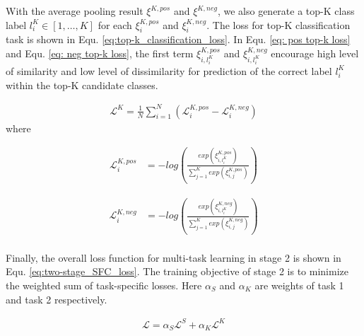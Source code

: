 \documentclass[letterpaper]{article} %
\begin{document}
  With  the  average pooling result ${\xi}^{K,pos}$ and ${\xi}^{K,neg}$, we also
  generate   a   top-K   class   label   $l^{K}_i\in   [1,\dots,K]$   for   each
  ${\xi}^{K,pos}_{i}$ and ${\xi}^{K,neg}_{i}$. The loss for top-K classification
  task is shown in Equ. \ref{eq:top-k_classification_loss}. In Equ. \ref{eq: pos
  top-k   loss}   and   Equ.   \ref{eq:   neg   top-k   loss},  the  first  term
  $\xi_{i,l^{K}_{i}}^{K,pos}$  and  $\xi_{i,l^{K}_{i}}^{K,neg}$  encourage  high
  level  of  similarity  and  low  level  of dissimilarity for prediction of the
  correct label $l^{K}_i$ within the top-K candidate classes.

  \begin{align}
    \mathcal{L}^{K} = \frac{1}{N}\sum_{i=1}^{N}(\mathcal{L}^{K,pos}_{i} - \mathcal{L}^{K,neg}_{i})
    \label{eq:top-k_classification_loss}
  \end{align}
  where

  \begin{equation}
    \begin{aligned}
      \mathcal{L}^{K,pos}_{i} &= -log(\frac{exp(\xi_{i,l^{K}_{i}}^{K,pos})}{\sum_{j=1}^{K}exp(\xi_{i,j}^{K,pos})})
      \label{eq: pos top-k loss}
    \end{aligned}
  \end{equation}

  \begin{equation}
    \begin{aligned}
      \mathcal{L}^{K,neg}_{i} &= -log(\frac{exp(\xi_{i,l^{K}_{i}}^{K,neg})}{\sum_{j=1}^{K}exp(\xi_{i,j}^{K,neg})}) \\
      \label{eq: neg top-k loss}
    \end{aligned}
  \end{equation}

  Finally,  the  overall  loss  function for multi-task learning in stage 2 is
  shown in Equ. \ref{eq:two-stage_SFC_loss}. The training objective of stage 2 is
  to  minimize  the  weighted  sum  of task-specific losses. Here $\alpha_S$ and
  $\alpha_K$  are  weights  of  task  1  and  task  2  respectively.

  \begin{align}
    \mathcal{L} = \alpha_S \mathcal{L}^S + \alpha_K \mathcal{L}^K
    \label{eq:two-stage_SFC_loss}
  \end{align}
\end{document}
